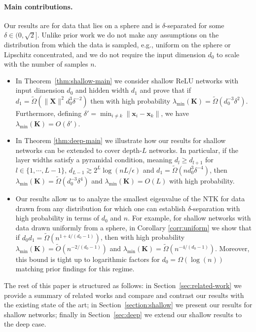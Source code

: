 \documentclass{article}
\theoremstyle{definition}
\def\vx{{\bm{x}}}
\def\mK{{\bm{K}}}
\def\mX{{\bm{X}}}
\begin{document}
\paragraph{Main contributions.} 
Our results are for data that lies on a sphere and is $\delta$-separated for some~$\delta \in (0,\sqrt{2}]$. Unlike prior work  
we do not make any assumptions on the distribution from which the data is sampled,  
e.g., uniform on the sphere or Lipschitz concentrated, and 
we do not require the input dimension $d_0$ to scale with the number of samples $n$.
\begin{itemize}
    \item In Theorem~\ref{thm:shallow-main} we consider shallow 
    ReLU networks with input dimension $d_0$ and hidden width $d_1$ and prove that if $d_1 = \tilde{\Omega}(\|\mX\|^2 d_0^3 \delta^{-2})$ then with high probability $\lambda_{\min}(\mK) = \tilde{\Omega}(d_0^{-3}\delta^2)$. Furthermore, defining $\delta' = \min_{i \neq k}\|\vx_i - \vx_k\|
    $, we have $\lambda_{\min}(\mK) = O( \delta')$. 
    \item In Theorem \ref{thm:deep-main} we illustrate how our results for shallow networks can be extended to cover depth-$L$ networks. In particular, if the layer widths satisfy a pyramidal condition, meaning $d_l \geq d_{l+1}$ for $l \in     \{1,\cdots,L-1\}$,     $d_{L-1} \gtrsim 2^L \log(nL/ \epsilon)$ and $d_1 = \tilde{\Omega}(nd_0^3 \delta^{-4} )$, then $\lambda_{\min}(\mK) = \tilde{\Omega}(d_0^{-3}\delta^{4})$ and $\lambda_{\min}(\mK) = O(L)$ with high probability. 
    \item Our results allow us to analyze the smallest eigenvalue of the NTK for data drawn from any distribution for which one can establish $\delta$-separation with high probability in terms of $d_0$ and $n$. For example, for shallow networks with data drawn uniformly from a sphere, in Corollary \ref{corr:uniform} we show that if $d_0d_1 = \tilde{\Omega}(n^{1 + 4/(d_0-1)})$, then with high probability $\lambda_{\min}(\mK) = \tilde{O}\left(n^{-2/(d_0-1)} \right)$ and $\lambda_{\min}(\mK) = \tilde{\Omega}\left(n^{-4/(d_0-1)} \right)$. 
    Moreover, this bound is tight up to logarithmic factors for $d_0=\Omega(\log(n))$ matching prior findings for this regime. 
\end{itemize}

The rest of this paper is structured as follows: in Section~\ref{sec:related-work} we provide a summary of related works and compare and contrast our results with the existing state of the art; in Section~\ref{section:shallow} we present our results for shallow networks; finally in Section~\ref{sec:deep} we extend our shallow results to the deep case. 
\end{document}
